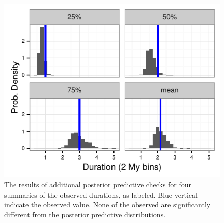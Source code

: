 \documentclass[12pt,letterpaper]{article}
\begin{document}
\begin{figure}[ht]
  \centering
  \includegraphics[height = 0.5\textheight, width = \textwidth, keepaspectratio = true]{figure/quant_ppc}
  \caption{The results of additional posterior predictive checks for four summaries of the observed durations, as labeled. Blue vertical indicate the observed value. None of the observed are significantly different from the posterior predictive distributions.}
  \label{fig:ppc_quant}
\end{figure}
\end{document}

